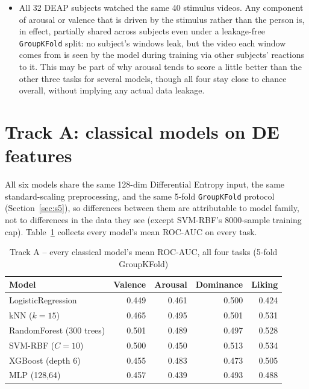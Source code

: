 \documentclass[11pt]{report}
\begin{document}
\begin{itemize}
        fold-luck-dependent than a Track A one (Section~\ref{sec:s11}'s
        repeated splits give mean AUC 0.483 non-overlap, consistent with the
        single-split numbers here).
  \item All 32 DEAP subjects watched the same 40 stimulus videos. Any
        component of arousal or valence that is driven by the stimulus
        rather than the person is, in effect, partially shared across
        subjects even under a leakage-free \texttt{GroupKFold} split: no
        subject's windows leak, but the video each window comes from is
        seen by the model during training via other subjects' reactions to
        it. This may be part of why arousal tends to score a little better
        than the other three tasks for several models, though all four
        stay close to chance overall, without implying any actual data
        leakage.
\end{itemize}

\section{Track A: classical models on DE features}
\label{sec:ma-tracka}
All six models share the same 128-dim Differential Entropy input, the same
standard-scaling preprocessing, and the same 5-fold \texttt{GroupKFold}
protocol (Section~\ref{sec:s5}), so differences between them are
attributable to model family, not to differences in the data they see
(except SVM-RBF's 8000-sample training cap). Table~\ref{tab:ma-tracka-auc}
collects every model's mean ROC-AUC on every task.

\begin{table}[H]
\centering
\caption{Track A -- every classical model's mean ROC-AUC, all four tasks
(5-fold GroupKFold)}
\label{tab:ma-tracka-auc}
\begin{tabular}{lrrrr}
\toprule
Model & Valence & Arousal & Dominance & Liking \\
\midrule
LogisticRegression & 0.449 & 0.461 & 0.500 & 0.424 \\
kNN ($k=15$)        & 0.465 & 0.495 & 0.501 & 0.531 \\
RandomForest (300 trees) & 0.501 & 0.489 & 0.497 & 0.528 \\
SVM-RBF ($C=10$)    & 0.500 & 0.450 & 0.513 & 0.534 \\
XGBoost (depth 6)   & 0.455 & 0.483 & 0.473 & 0.505 \\
MLP (128,64)        & 0.457 & 0.439 & 0.493 & 0.488 \\
\bottomrule
\end{tabular}
\end{table}
\end{document}
